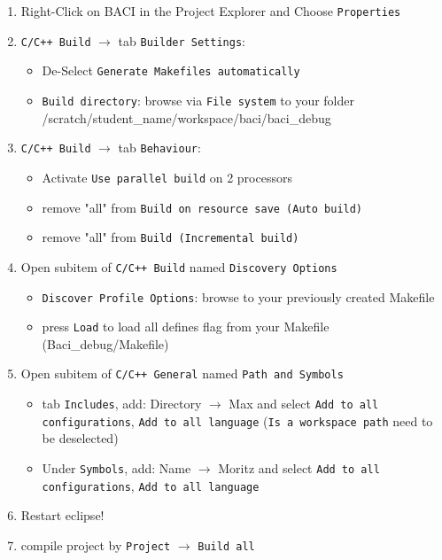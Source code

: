 \begin{enumerate}
\item Right-Click on BACI in the Project Explorer and Choose \texttt{Properties}

\item \texttt{C/C++ Build} $ \rightarrow $ tab \texttt{Builder Settings}:
\begin{itemize}
 \item De-Select \texttt{Generate Makefiles automatically}
 \item \texttt{Build directory}: browse via \texttt{File system} to your folder \\
 /scratch/student\_name/workspace/baci/baci\_debug
\end{itemize}

\item \texttt{C/C++ Build} $ \rightarrow $ tab \texttt{Behaviour}:
\begin{itemize}
  \item Activate \texttt{Use parallel build} on 2 processors
  \item remove "all" from \texttt{Build on resource save (Auto build)}
  \item remove "all" from \texttt{Build (Incremental build)}
\end{itemize}

\item Open subitem of \texttt{C/C++ Build} named \texttt{Discovery Options}
\begin{itemize}
 \item \texttt{Discover Profile Options}: browse to your previously created Makefile
 \item press \texttt{Load} to load all defines flag from your Makefile (Baci\_debug/Makefile)
\end{itemize}

\item Open subitem of \texttt{C/C++ General} named \texttt{Path and Symbols}
\begin{itemize}
  \item tab \texttt{Includes}, add: Directory $\rightarrow$ Max and select \texttt{Add to all configurations}, \texttt{Add to all language} (\texttt{Is a workspace path} need to be deselected)
  \item Under \texttt{Symbols}, add: Name $\rightarrow$ Moritz and select \texttt{Add to all configurations}, \texttt{Add to all language}
\end{itemize}

\item Restart eclipse!

\item compile project by \texttt{Project} $\rightarrow$ \texttt{Build all}
\end{enumerate}

